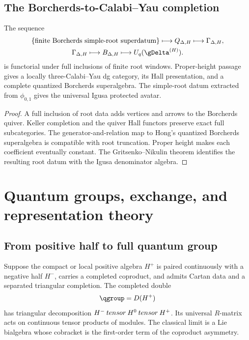 \chapter{The Borcherds-to-Calabi--Yau completion}
\begin{theorem}
The sequence
\[
\begin{gathered}
 \set{\text{finite Borcherds simple-root superdatum}}
 \longmapsto Q_{\Delta,H}
 \longmapsto \Gamma_{\Delta,H},\\
 \Gamma_{\Delta,H}
 \longmapsto \mathcal B_{\Delta,H}
 \longmapsto U_q(\gDelta^{(H)}).
\end{gathered}
\]
is functorial under full inclusions of finite root windows.  Proper-height passage gives a locally three-Calabi--Yau dg category, its Hall presentation, and a complete quantized Borcherds superalgebra.  The simple-root datum extracted from $\phi_{0,1}$ gives the universal Igusa protected avatar.
\end{theorem}
\begin{proof}
A full inclusion of root data adds vertices and arrows to the Borcherds quiver.  Keller completion and the quiver Hall functors preserve exact full subcategories.  The generator-and-relation map to Hong's quantized Borcherds superalgebra is compatible with root truncation.  Proper height makes each coefficient eventually constant.  The Gritsenko--Nikulin theorem identifies the resulting root datum with the Igusa denominator algebra.
\end{proof}


\part{Quantum groups, exchange, and representation theory}

\chapter{From positive half to full quantum group}
Suppose the compact or local positive algebra $H^+$ is paired continuously with a negative half $H^-$, carries a completed coproduct, and admits Cartan data and a separated triangular completion. The completed double
\[
 \qgroup=\widehat D(H^+)
\]
has triangular decomposition $H^-\mathbin{tensor} H^0\mathbin{tensor} H^+$. Its universal $R$-matrix acts on continuous tensor products of modules. The classical limit is a Lie bialgebra whose cobracket is the first-order term of the coproduct asymmetry.

